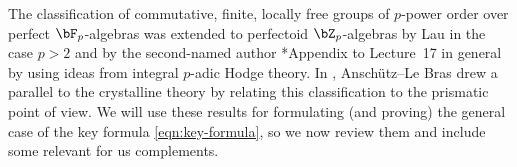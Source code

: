 



















\label{section:Dieudonne-mixed-characteristic}



The classification of commutative, finite, locally free groups of $p$-power order over perfect $\bF_p$-algebras %
was extended to perfectoid $\bZ_p$-algebras by Lau \cite{Lau18} in the case $p > 2$ and by the second-named author \cite{SW19}*{Appendix to Lecture~17} in general by using ideas from integral $p$-adic Hodge theory. In \cite{ALB20}, Ansch\"utz--Le Bras drew a parallel to the crystalline theory %
by relating this classification to the prismatic point of view. We will use these results for formulating (and proving) the general case of the key formula \eqref{eqn:key-formula}, so we now review them and include some relevant for us complements.

